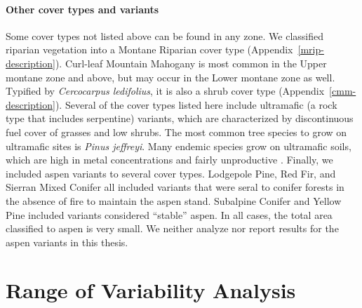 \paragraph{Other cover types and variants} Some cover types not listed above can be found in any zone. We classified riparian vegetation into a Montane Riparian cover type (Appendix~\ref{mrip-description}). 
%
Curl-leaf Mountain Mahogany is most common in the Upper montane zone and above, but may occur in the Lower montane zone as well. Typified by \emph{Cercocarpus ledifolius}, it is also a shrub cover type (Appendix~\ref{cmm-description}). 
%
Several of the cover types listed here include ultramafic (a rock type that includes serpentine) variants, which are characterized by discontinuous fuel cover of grasses and low shrubs. The most common tree species to grow on ultramafic sites is \emph{Pinus jeffreyi}. Many endemic species grow on ultramafic soils, which are high in metal concentrations and fairly unproductive \citep{OGeen2007}.
%
Finally, we included aspen variants to several cover types. Lodgepole Pine, Red Fir, and Sierran Mixed Conifer all included variants that were seral to conifer forests in the absence of fire to maintain the aspen stand. Subalpine Conifer and Yellow Pine included variants considered ``stable'' aspen. In all cases, the total area classified to aspen is very small. We neither analyze nor report results for the aspen variants in this thesis.





\section{Range of Variability Analysis}

